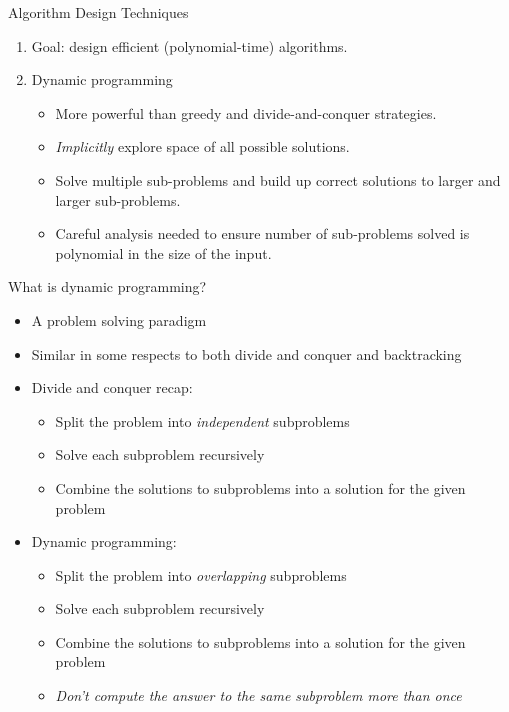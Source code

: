    \begin{frame}[fragile]{Algorithm Design Techniques}

  \begin{enumerate}
  \item Goal: design efficient (polynomial-time) algorithms.
  \item Dynamic programming
    \begin{itemize}
    \item More powerful than greedy and divide-and-conquer strategies.
    \item \emph{Implicitly} explore space of all possible solutions.
    \item Solve multiple sub-problems and build up correct solutions to
      larger and larger sub-problems.
    \item Careful analysis needed to ensure number of sub-problems
      solved is polynomial in the size of the input.
    \end{itemize}
  \end{enumerate}
\end{frame}


   \begin{frame}[fragile]{What is dynamic programming?}
    \begin{itemize}
        \item A problem solving paradigm
        \item Similar in some respects to both divide and conquer and backtracking
        \item Divide and conquer recap:
            \begin{itemize}
                \item Split the problem into \textit{independent} subproblems
                \item Solve each subproblem recursively
                \item Combine the solutions to subproblems into a solution for the given problem
            \end{itemize}
        \item Dynamic programming:
            \begin{itemize}
                \item Split the problem into \textit{overlapping} subproblems
                \item Solve each subproblem recursively
                \item Combine the solutions to subproblems into a solution for the given problem
                \item \textit{Don't compute the answer to the same subproblem more than once}
            \end{itemize}
    \end{itemize}
\end{frame}

